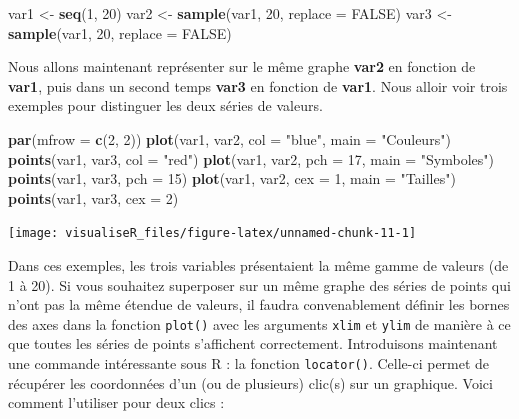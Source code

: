 \documentclass[]{article}
\newenvironment{Shaded}{\begin{snugshade}}{\end{snugshade}}
\newcommand{\DataTypeTok}[1]{\textcolor[rgb]{0.13,0.29,0.53}{#1}}
\newcommand{\DecValTok}[1]{\textcolor[rgb]{0.00,0.00,0.81}{#1}}
\newcommand{\KeywordTok}[1]{\textcolor[rgb]{0.13,0.29,0.53}{\textbf{#1}}}
\newcommand{\NormalTok}[1]{#1}
\newcommand{\OtherTok}[1]{\textcolor[rgb]{0.56,0.35,0.01}{#1}}
\newcommand{\StringTok}[1]{\textcolor[rgb]{0.31,0.60,0.02}{#1}}
\begin{document}
\begin{Shaded}
\begin{Highlighting}[]
\NormalTok{var1 <-}\StringTok{ }\KeywordTok{seq}\NormalTok{(}\DecValTok{1}\NormalTok{, }\DecValTok{20}\NormalTok{)}
\NormalTok{var2 <-}\StringTok{ }\KeywordTok{sample}\NormalTok{(var1, }\DecValTok{20}\NormalTok{, }\DataTypeTok{replace =} \OtherTok{FALSE}\NormalTok{)}
\NormalTok{var3 <-}\StringTok{ }\KeywordTok{sample}\NormalTok{(var1, }\DecValTok{20}\NormalTok{, }\DataTypeTok{replace =} \OtherTok{FALSE}\NormalTok{)}
\end{Highlighting}
\end{Shaded}

Nous allons maintenant représenter sur le même graphe \textbf{var2} en fonction de \textbf{var1}, puis dans un second temps \textbf{var3} en fonction de \textbf{var1}. Nous alloir voir trois exemples pour distinguer les deux séries de valeurs.

\begin{Shaded}
\begin{Highlighting}[]
\KeywordTok{par}\NormalTok{(}\DataTypeTok{mfrow =} \KeywordTok{c}\NormalTok{(}\DecValTok{2}\NormalTok{, }\DecValTok{2}\NormalTok{))}
\KeywordTok{plot}\NormalTok{(var1, var2, }\DataTypeTok{col =} \StringTok{"blue"}\NormalTok{, }\DataTypeTok{main =} \StringTok{"Couleurs"}\NormalTok{)}
\KeywordTok{points}\NormalTok{(var1, var3, }\DataTypeTok{col =} \StringTok{"red"}\NormalTok{)}
\KeywordTok{plot}\NormalTok{(var1, var2, }\DataTypeTok{pch =} \DecValTok{17}\NormalTok{, }\DataTypeTok{main =} \StringTok{"Symboles"}\NormalTok{)}
\KeywordTok{points}\NormalTok{(var1, var3, }\DataTypeTok{pch =} \DecValTok{15}\NormalTok{)}
\KeywordTok{plot}\NormalTok{(var1, var2, }\DataTypeTok{cex =} \DecValTok{1}\NormalTok{, }\DataTypeTok{main =} \StringTok{"Tailles"}\NormalTok{)}
\KeywordTok{points}\NormalTok{(var1, var3, }\DataTypeTok{cex =} \DecValTok{2}\NormalTok{)}
\end{Highlighting}
\end{Shaded}

\begin{center}\texttt{[image: visualiseR\_files/figure-latex/unnamed-chunk-11-1]} \end{center}

Dans ces exemples, les trois variables présentaient la même gamme de valeurs (de 1 à 20). Si vous souhaitez superposer sur un même graphe des séries de points qui n'ont pas la même étendue de valeurs, il faudra convenablement définir les bornes des axes dans la fonction \texttt{plot()} avec les arguments \texttt{xlim} et \texttt{ylim} de manière à ce que toutes les séries de points s'affichent correctement.
Introduisons maintenant une commande intéressante sous R : la fonction \texttt{locator()}. Celle-ci permet de récupérer les coordonnées d'un (ou de plusieurs) clic(s) sur un graphique. Voici comment l'utiliser pour deux clics :
\end{document}
